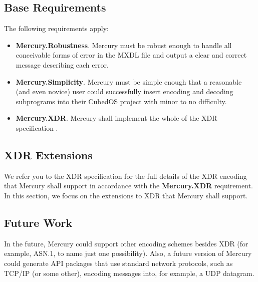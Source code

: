 \subsection{Base Requirements}

The following requirements apply:

\begin{itemize}
\item \textbf{Mercury.Robustness}. Mercury must be robust enough to handle all conceivable forms
of error in the MXDL file and output a clear and correct message describing each error.

\item \textbf{Mercury.Simplicity}. Mercury must be simple enough that a reasonable (and even
novice) user could successfully insert encoding and decoding subprograms into their CubedOS
project with minor to no difficulty.

\item \textbf{Mercury.XDR}. Mercury shall implement the whole of the XDR specification
\cite{rfc-4506}.
\end{itemize}

\subsection{XDR Extensions}

We refer you to the XDR specification \cite{rfc-4506} for the full details of the XDR encoding
that Mercury shall support in accordance with the \textbf{Mercury.XDR} requirement. In this
section, we focus on the extensions to XDR that Mercury shall support.


\subsection{Future Work}

In the future, Mercury could support other encoding schemes besides XDR (for example, ASN.1, to
name just one possibility). Also, a future version of Mercury could generate API packages that
use standard network protocols, such as TCP/IP (or some other), encoding messages into, for
example, a UDP datagram.
